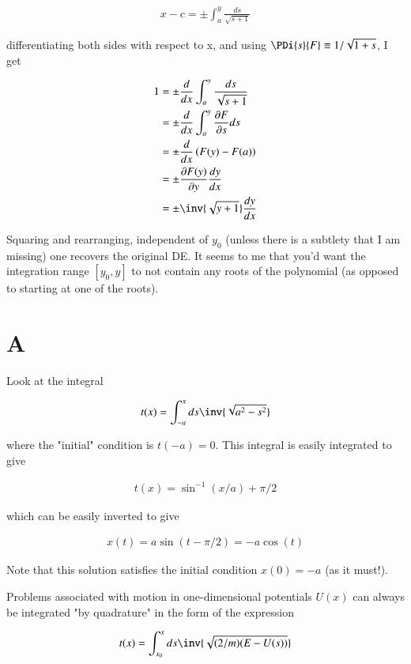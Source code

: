 \begin{align*}
x - c = \pm \int_{a}^y \frac{ds}{\sqrt{s + 1}}
\end{align*}

differentiating both sides with respect to x, and using $\PDi{s}{F} \equiv 1/\sqrt{1 + s}$, I get

\begin{align*}
1 
&= \pm \frac{d}{dx} \int_{a}^y \frac{ds}{\sqrt{s + 1}} \\
&= \pm \frac{d}{dx} \int_{a}^y \PD{s}{F} ds \\
&= \pm \frac{d}{dx} \left(F(y) - F(a)\right) \\
&= \pm \PD{y}{F(y)} \frac{dy}{dx} \\
&= \pm \inv{\sqrt{y + 1}} \frac{dy}{dx} \\
\end{align*}

Squaring and rearranging, independent of $y_0$ (unless there is a subtlety that I am missing) one recovers the original DE.  It seems to me that you'd want the integration range $[y_0,y]$ to not contain any roots of the polynomial (as opposed to starting at one of the roots).

\section{A}

Look at the integral

\begin{align*}
t(x) = \int_{-a}^x ds \inv{\sqrt{a^2 - s^2}}
\end{align*}

where the "initial" condition is $t(-a) = 0$. This integral is easily
integrated to give

\begin{align*}
t(x) = \sin^{-1}(x/a) + \pi/2
\end{align*}

which can be easily inverted to give

\begin{align*}
x(t) = a \sin(t - \pi/2) = - a \cos(t)
\end{align*}

Note that this solution satisfies the initial condition $x(0) = -a$ (as it must!).

Problems associated with motion in one-dimensional potentials $U(x)$ can always be integrated "by quadrature" in the form of the expression

\begin{align*}
t(x) = \int_{x_0}^x ds \inv{\sqrt{(2/m) (E - U(s))}}
\end{align*}

